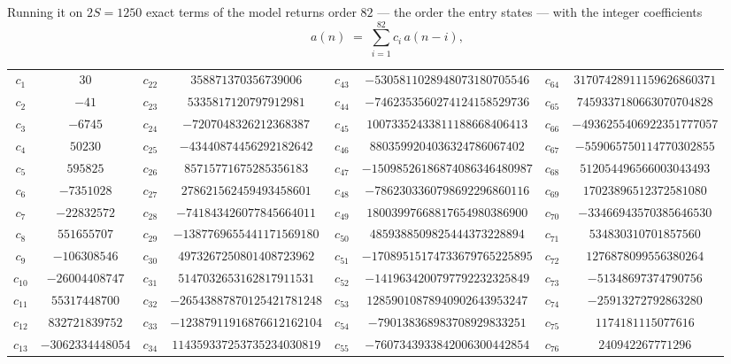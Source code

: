 \documentclass[11pt,a4paper]{article}
\theoremstyle{plain}
\theoremstyle{definition}
\begin{document}
Running it on $2S=1250$ exact terms of the model returns order $82$ --- the order the
entry states --- with the integer coefficients
\[
a(n)\;=\;\sum_{i=1}^{82}c_i\,a(n-i),
\]
\begin{center}\small
\begin{tabular}{cccccccc}
$c_{1}$ & $30$ & $c_{22}$ & $358871370356739006$ & $c_{43}$ & $-5305811028948073180705546$ & $c_{64}$ & $31707428911159626860371$ \\
$c_{2}$ & $-41$ & $c_{23}$ & $5335817120797912981$ & $c_{44}$ & $-7462353560274124158529736$ & $c_{65}$ & $7459337180663070704828$ \\
$c_{3}$ & $-6745$ & $c_{24}$ & $-7207048326212368387$ & $c_{45}$ & $10073352433811188668406413$ & $c_{66}$ & $-4936255406922351777057$ \\
$c_{4}$ & $50230$ & $c_{25}$ & $-43440874456292182642$ & $c_{46}$ & $8803599204036324786067402$ & $c_{67}$ & $-559065750114770302855$ \\
$c_{5}$ & $595825$ & $c_{26}$ & $85715771675285356183$ & $c_{47}$ & $-15098526186874086346480987$ & $c_{68}$ & $512054496566003043493$ \\
$c_{6}$ & $-7351028$ & $c_{27}$ & $278621562459493458601$ & $c_{48}$ & $-7862303360798692296860116$ & $c_{69}$ & $17023896512372581080$ \\
$c_{7}$ & $-22832572$ & $c_{28}$ & $-741843426077845664011$ & $c_{49}$ & $18003997668817654980386900$ & $c_{70}$ & $-33466943570385646530$ \\
$c_{8}$ & $551655707$ & $c_{29}$ & $-1387769655441171569180$ & $c_{50}$ & $4859388509825444373228894$ & $c_{71}$ & $534830310701857560$ \\
$c_{9}$ & $-106308546$ & $c_{30}$ & $4973267250801408723962$ & $c_{51}$ & $-17089515174733679765225895$ & $c_{72}$ & $1276878099556380264$ \\
$c_{10}$ & $-26004408747$ & $c_{31}$ & $5147032653162817911531$ & $c_{52}$ & $-1419634200797792232325849$ & $c_{73}$ & $-51348697374790756$ \\
$c_{11}$ & $55317448700$ & $c_{32}$ & $-26543887870125421781248$ & $c_{53}$ & $12859010878940902643953247$ & $c_{74}$ & $-25913272792863280$ \\
$c_{12}$ & $832721839752$ & $c_{33}$ & $-12387911916876612162104$ & $c_{54}$ & $-790138368983708929833251$ & $c_{75}$ & $1174181115077616$ \\
$c_{13}$ & $-3062334448054$ & $c_{34}$ & $114359337253735234030819$ & $c_{55}$ & $-7607343933842006300442854$ & $c_{76}$ & $240942267771296$ \\

\end{tabular}
\end{center}
\end{document}

